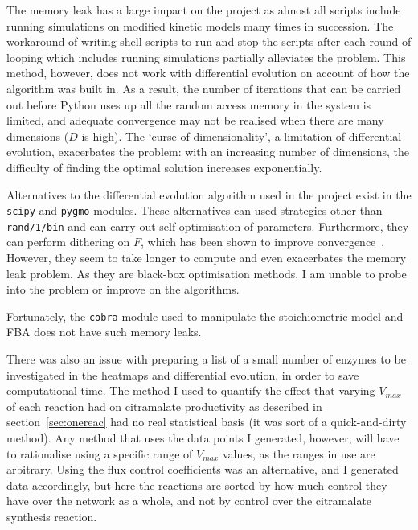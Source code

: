 \documentclass[parskip=full]{scrreprt}
\begin{document}
The memory leak has a large impact on the project as almost all scripts include running simulations on modified kinetic models many times in succession. The workaround of writing shell scripts to run and stop the scripts after each round of looping which includes running simulations partially alleviates the problem. This method, however, does not work with differential evolution on account of how the algorithm was built in. As a result, the number of iterations that can be carried out before Python uses up all the random access memory in the system is limited, and adequate convergence may not be realised when there are many dimensions ($D$ is high). The `curse of dimensionality', a limitation of differential evolution, exacerbates the problem: with an increasing number of dimensions, the difficulty of finding the optimal solution increases exponentially.

Alternatives to the differential evolution algorithm used in the project exist in the \texttt{scipy} and \texttt{pygmo} modules. These alternatives can used strategies other than \texttt{rand/1/bin} and can carry out self-optimisation of parameters. Furthermore, they can perform dithering on $F$, which has been shown to improve convergence~\cite{storn_differential_1997}. However, they seem to take longer to compute and even exacerbates the memory leak problem. As they are black-box optimisation methods, I am unable to probe into the problem or improve on the algorithms.

Fortunately, the \texttt{cobra} module used to manipulate the stoichiometric model and FBA does not have such memory leaks.

There was also an issue with preparing a list of a small number of enzymes to be investigated in the heatmaps and differential evolution, in order to save computational time. The method I used to quantify the effect that varying $V_{max}$ of each reaction had on citramalate productivity as described in section~\ref{sec:onereac} had no real statistical basis (it was sort of a quick-and-dirty method). Any method that uses the data points I generated, however, will have to rationalise using a specific range of $V_{max}$ values, as the ranges in use are arbitrary. Using the flux control coefficients was an alternative, and I generated data accordingly, but here the reactions are sorted by how much control they have over the network as a whole, and not by control over the citramalate synthesis reaction.
\end{document}
